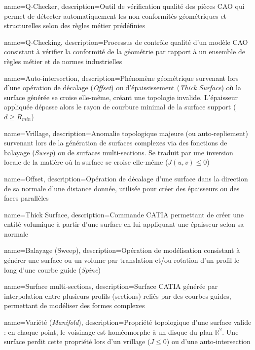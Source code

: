 
{
    name=Q-Checker,
    description={Outil de vérification qualité des pièces CAO qui permet de détecter automatiquement les non-conformités géométriques et structurelles selon des règles métier prédéfinies}
}

{
    name=Q-Checking,
    description={Processus de contrôle qualité d'un modèle CAO consistant à vérifier la conformité de la géométrie par rapport à un ensemble de règles métier et de normes industrielles}
}

{
    name=Auto-intersection,
    description={Phénomène géométrique survenant lors d'une opération de décalage (\textit{Offset}) ou d'épaississement (\textit{Thick Surface}) où la surface générée se croise elle-même, créant une topologie invalide. L'épaisseur appliquée dépasse alors le rayon de courbure minimal de la surface support ($d \ge R_{min}$)}
}

{
    name=Vrillage,
    description={Anomalie topologique majeure (ou auto-repliement) survenant lors de la génération de surfaces complexes via des fonctions de balayage (\textit{Sweep}) ou de surfaces multi-sections. Se traduit par une inversion locale de la matière où la surface se croise elle-même ($J(u,v) \le 0$)}
}

{
    name=Offset,
    description={Opération de décalage d'une surface dans la direction de sa normale d'une distance donnée, utilisée pour créer des épaisseurs ou des faces parallèles}
}

{
    name=Thick Surface,
    description={Commande CATIA permettant de créer une entité volumique à partir d'une surface en lui appliquant une épaisseur selon sa normale}
}

{
    name=Balayage (Sweep),
    description={Opération de modélisation consistant à générer une surface ou un volume par translation et/ou rotation d'un profil le long d'une courbe guide (\textit{Spine})}
}

{
    name=Surface multi-sections,
    description={Surface CATIA générée par interpolation entre plusieurs profils (sections) reliés par des courbes guides, permettant de modéliser des formes complexes}
}

{
    name=Variété (\textit{Manifold}),
    description={Propriété topologique d'une surface valide : en chaque point, le voisinage est homéomorphe à un disque du plan $\mathbb{R}^2$. Une surface perdit cette propriété lors d'un vrillage ($J \le 0$) ou d'une auto-intersection}
}

